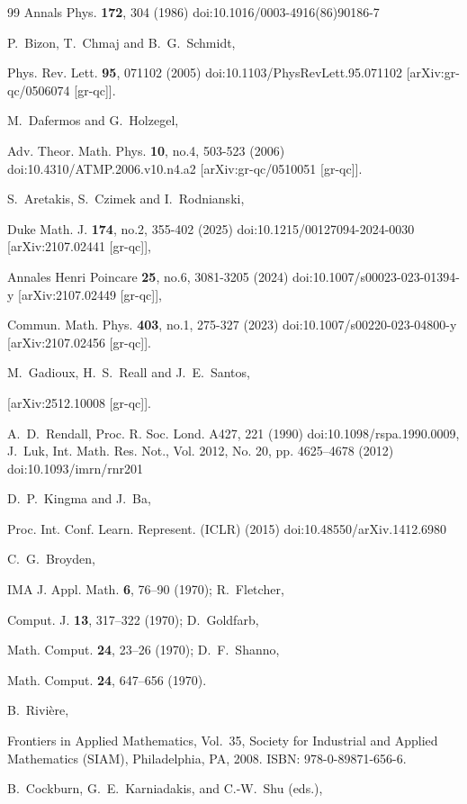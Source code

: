 \documentclass[prl,twocolumn,superscriptaddress,nofootinbib]{revtex4-2}
\begin{document}
\begin{thebibliography}{99}
Annals Phys. \textbf{172}, 304 (1986)
doi:10.1016/0003-4916(86)90186-7



P.~Bizon, T.~Chmaj and B.~G.~Schmidt,

Phys. Rev. Lett. \textbf{95}, 071102 (2005)
doi:10.1103/PhysRevLett.95.071102
[arXiv:gr-qc/0506074 [gr-qc]].


M.~Dafermos and G.~Holzegel,

Adv. Theor. Math. Phys. \textbf{10}, no.4, 503-523 (2006)
doi:10.4310/ATMP.2006.v10.n4.a2
[arXiv:gr-qc/0510051 [gr-qc]].


S.~Aretakis, S.~Czimek and I.~Rodnianski,

Duke Math. J. \textbf{174}, no.2, 355-402 (2025)
doi:10.1215/00127094-2024-0030
[arXiv:2107.02441 [gr-qc]],

Annales Henri Poincare \textbf{25}, no.6, 3081-3205 (2024)
doi:10.1007/s00023-023-01394-y
[arXiv:2107.02449 [gr-qc]],

Commun. Math. Phys. \textbf{403}, no.1, 275-327 (2023)
doi:10.1007/s00220-023-04800-y
[arXiv:2107.02456 [gr-qc]].


M.~Gadioux, H.~S.~Reall and J.~E.~Santos,

[arXiv:2512.10008 [gr-qc]].

A.~D.~Rendall, Proc. R. Soc. Lond. A427, 221 (1990)
doi:10.1098/rspa.1990.0009,
J.~Luk, Int. Math. Res. Not., Vol. 2012, No. 20, pp. 4625–4678 (2012) doi:10.1093/imrn/rnr201


D.~P.~Kingma and J.~Ba,

Proc. Int. Conf. Learn. Represent. (ICLR) (2015)
doi:10.48550/arXiv.1412.6980


C.~G.~Broyden,

IMA J. Appl. Math. \textbf{6}, 76--90 (1970);
R.~Fletcher,

Comput. J. \textbf{13}, 317--322 (1970);
D.~Goldfarb,

Math. Comput. \textbf{24}, 23--26 (1970);
D.~F.~Shanno,

Math. Comput. \textbf{24}, 647--656 (1970).


B.~Rivi{\`e}re,

Frontiers in Applied Mathematics, Vol.\ 35,
Society for Industrial and Applied Mathematics (SIAM), Philadelphia, PA, 2008.
ISBN: 978-0-89871-656-6.


B.~Cockburn, G.~E.~Karniadakis, and C.-W.~Shu (eds.),


\end{thebibliography}
\end{document}
